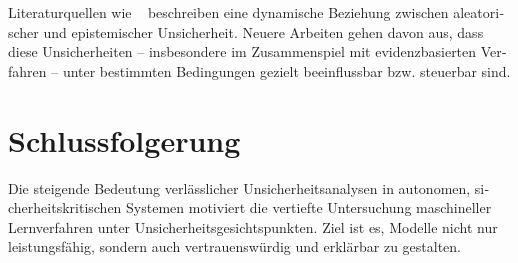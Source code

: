 \begin{otherlanguage}{ngerman}
Literaturquellen wie ~\parencite{ArthurHoarau2025} beschreiben eine dynamische Beziehung zwischen aleatorischer und epistemischer Unsicherheit. Neuere Arbeiten gehen davon aus, dass diese Unsicherheiten – insbesondere im Zusammenspiel mit evidenzbasierten Verfahren – unter bestimmten Bedingungen gezielt beeinflussbar bzw. steuerbar sind.

\section{Schlussfolgerung}

Die steigende Bedeutung verlässlicher Unsicherheitsanalysen in autonomen, sicherheitskritischen Systemen motiviert die vertiefte Untersuchung maschineller Lernverfahren unter Unsicherheitsgesichtspunkten. Ziel ist es, Modelle nicht nur leistungsfähig, sondern auch vertrauenswürdig und erklärbar zu gestalten.
\end{otherlanguage}
